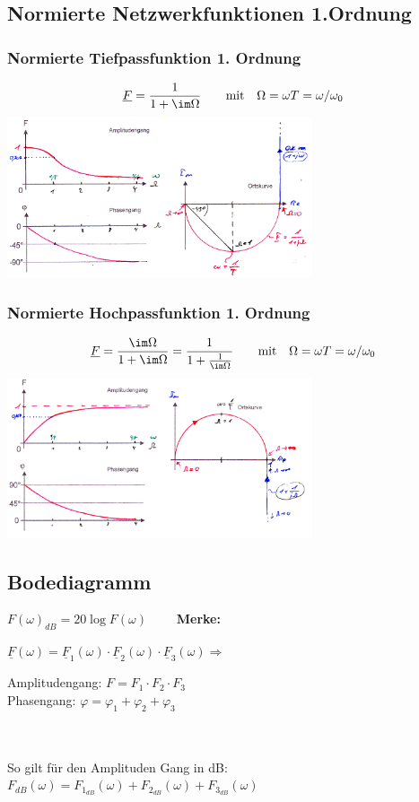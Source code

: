 	\subsection{Normierte Netzwerkfunktionen 1.Ordnung}
	\begin{multicols}{2} 
		\subsubsection{Normierte Tiefpassfunktion 1. Ordnung}
		\[ \underline{F} = \dfrac{1}{1 + \im \Omega} \qquad \text{mit} \quad \Omega = \omega T = \omega/\omega_0\]
		\includegraphics[width=9cm]{./images/freq-norm-TP-1Ordnung}
	\columnbreak
		\subsubsection{Normierte Hochpassfunktion 1. Ordnung}
		\[ \underline{F} = \dfrac{\im \Omega}{1 + \im \Omega} = \dfrac{1}{1 + \frac{1}{\im \Omega}} \qquad \text{mit} \quad \Omega = \omega T = \omega/\omega_0\]
		\includegraphics[width=9cm]{./images/freq-norm-HP-1Ordnung}
	\end{multicols}
	
	\subsection{Bodediagramm}
	
	$\boxed{F(\omega)_{dB} = 20 \log F(\omega)} \qquad$
	\textbf{Merke:  } 
	\begin{minipage}{12cm}
		$\underline{F}(\omega) = \underline{F}_1(\omega)\cdot \underline{F}_2(\omega)\cdot \underline{F}_3(\omega) \Rightarrow$
		\parbox{8cm}{Amplitudengang: $ F = F_1\cdot F_2 \cdot F_3$\\
		Phasengang: $\varphi = \varphi_1 + \varphi_2 + \varphi_3$ }\\ \\
		So gilt für den Amplituden Gang in dB: 
		$F_{dB}(\omega) = F_{1_{dB}}(\omega) +  F_{2_{dB}}(\omega) + F_{3_{dB}}(\omega)$
	\end{minipage}\\
	

